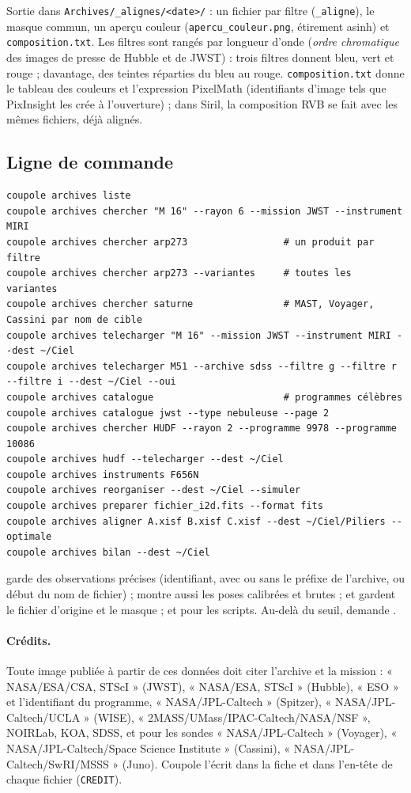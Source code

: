 Sortie dans \texttt{Archives/\_alignes/<date>/} : un fichier par filtre (\texttt{\_aligne}), le masque commun, un
aperçu couleur (\texttt{apercu\_couleur.png}, étirement asinh) et \texttt{composition.txt}. Les filtres sont rangés
par longueur d'onde (\emph{ordre chromatique} des images de presse de Hubble et de JWST) : trois filtres donnent
bleu, vert et rouge ; davantage, des teintes réparties du bleu au rouge. \texttt{composition.txt} donne le tableau des
couleurs et l'expression PixelMath (identifiants d'image tels que PixInsight les crée à l'ouverture) ; dans Siril,
la composition RVB se fait avec les mêmes fichiers, déjà alignés.

\subsection{Ligne de commande}
\begin{verbatim}
coupole archives liste
coupole archives chercher "M 16" --rayon 6 --mission JWST --instrument MIRI
coupole archives chercher arp273                 # un produit par filtre
coupole archives chercher arp273 --variantes     # toutes les variantes
coupole archives chercher saturne                # MAST, Voyager, Cassini par nom de cible
coupole archives telecharger "M 16" --mission JWST --instrument MIRI --dest ~/Ciel
coupole archives telecharger M51 --archive sdss --filtre g --filtre r --filtre i --dest ~/Ciel --oui
coupole archives catalogue                       # programmes célèbres
coupole archives catalogue jwst --type nebuleuse --page 2
coupole archives chercher HUDF --rayon 2 --programme 9978 --programme 10086
coupole archives hudf --telecharger --dest ~/Ciel
coupole archives instruments F656N
coupole archives reorganiser --dest ~/Ciel --simuler
coupole archives preparer fichier_i2d.fits --format fits
coupole archives aligner A.xisf B.xisf C.xisf --dest ~/Ciel/Piliers --optimale
coupole archives bilan --dest ~/Ciel
\end{verbatim}
 garde des observations précises (identifiant, avec ou sans le préfixe de l'archive, ou début du nom de
fichier) ;  montre aussi les poses calibrées et brutes ;  et
 gardent le fichier d'origine et le masque ;  et  pour les scripts. Au-delà du
seuil,  demande .

\paragraph{Crédits.} Toute image publiée à partir de ces données doit citer l'archive et la mission : « NASA/ESA/CSA,
STScI » (JWST), « NASA/ESA, STScI » (Hubble), « ESO » et l'identifiant du programme, « NASA/JPL-Caltech » (Spitzer),
« NASA/JPL-Caltech/UCLA » (WISE), « 2MASS/UMass/IPAC-Caltech/NASA/NSF », NOIRLab, KOA, SDSS, et pour les sondes
« NASA/JPL-Caltech » (Voyager), « NASA/JPL-Caltech/Space Science Institute » (Cassini), « NASA/JPL-Caltech/SwRI/MSSS »
(Juno). Coupole l'écrit dans la fiche et dans l'en-tête de chaque fichier (\texttt{CREDIT}).


